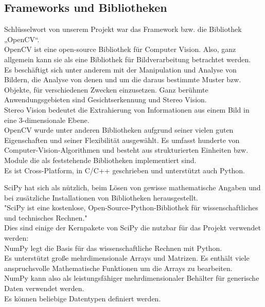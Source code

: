 \subsection{Frameworks und Bibliotheken}

\begin{flushleft}
	
	Schlüsselwort von unserem Projekt war das Framework bzw. die Bibliothek
	„OpenCV“.\\
	OpenCV ist eine open-source Bibliothek für Computer Vision. Also, ganz allgemein
	kann sie als eine Bibliothek für Bildverarbeitung betrachtet werden.\\
	Es beschäftigt sich unter anderem mit der Manipulation und Analyse von Bildern,
	die Analyse von denen und um die daraus bestimmte Muster bzw. Objekte, für
	verschiedenen Zwecken einzusetzen. Ganz berühmte Anwendungsgebieten sind
	Gesichtserkennung und Stereo Vision. \\
	Stereo Vision bedeutet die Extrahierung von Informationen aus einem Bild in eine
	3-dimensionale Ebene. \\
	OpenCV wurde unter anderen Bibliotheken aufgrund seiner vielen guten
	Eigenschaften und seiner Flexibilität ausgewählt. Es umfasst hunderte von
	Computer-Vision-Algorithmen und besteht aus strukturierten Einheiten bzw. Module
	die als feststehende Bibliotheken implementiert sind. \\
	Es ist Cross-Platform, in C/C++ geschrieben und unterstützt auch Python. \\
	\cite{opencv_library}
	
	SciPy hat sich als nützlich, beim Lösen von gewisse mathematische Angaben und
	bei zusätzliche Installationen von Bibliotheken herausgestellt.\\ 
	"SciPy ist eine kostenlose, Open-Source-Python-Bibliothek für wissenschaftliches
	und technisches Rechnen."\cite{2019arXiv190710121V-scipy}
	\\ 
	Dies sind einige der Kernpakete von SciPy die nutzbar für das Projekt verwendet
	werden:\\ 
	
	NumPy legt die Basis für das wissenschaftliche Rechnen mit Python.\\ Es
	unterstützt große mehrdimensionale Arrays und Matrizen. Es enthält viele
	anspruchsvolle Mathematische Funktionen um die Arrays zu bearbeiten.\\
	NumPy kann also als leistungsfähiger mehrdimensionaler Behälter für generische
	Daten verwendet werden.\\ Es können beliebige Datentypen definiert werden.\\
	

\end{flushleft}
